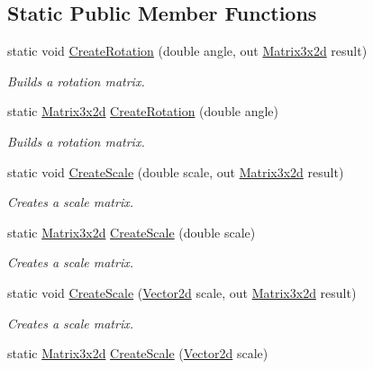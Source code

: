 \subsection*{Static Public Member Functions}
\begin{DoxyCompactItemize}
\item 
static void \hyperlink{struct_open_t_k_1_1_matrix3x2d_ad2a3abd5ddb3bcf591f5f39ba3d7c4f9}{Create\-Rotation} (double angle, out \hyperlink{struct_open_t_k_1_1_matrix3x2d}{Matrix3x2d} result)
\begin{DoxyCompactList}\small\item\em Builds a rotation matrix. \end{DoxyCompactList}\item 
static \hyperlink{struct_open_t_k_1_1_matrix3x2d}{Matrix3x2d} \hyperlink{struct_open_t_k_1_1_matrix3x2d_a1109feceae030386a0f25ecc1dbf5a28}{Create\-Rotation} (double angle)
\begin{DoxyCompactList}\small\item\em Builds a rotation matrix. \end{DoxyCompactList}\item 
static void \hyperlink{struct_open_t_k_1_1_matrix3x2d_ace558efd44d8eb53dae03909c1f8f26b}{Create\-Scale} (double scale, out \hyperlink{struct_open_t_k_1_1_matrix3x2d}{Matrix3x2d} result)
\begin{DoxyCompactList}\small\item\em Creates a scale matrix. \end{DoxyCompactList}\item 
static \hyperlink{struct_open_t_k_1_1_matrix3x2d}{Matrix3x2d} \hyperlink{struct_open_t_k_1_1_matrix3x2d_a2ba96869cfd644e502f3a5259a646184}{Create\-Scale} (double scale)
\begin{DoxyCompactList}\small\item\em Creates a scale matrix. \end{DoxyCompactList}\item 
static void \hyperlink{struct_open_t_k_1_1_matrix3x2d_a5088167a099ddd86e32a02cda3c39d3c}{Create\-Scale} (\hyperlink{struct_open_t_k_1_1_vector2d}{Vector2d} scale, out \hyperlink{struct_open_t_k_1_1_matrix3x2d}{Matrix3x2d} result)
\begin{DoxyCompactList}\small\item\em Creates a scale matrix. \end{DoxyCompactList}\item 
static \hyperlink{struct_open_t_k_1_1_matrix3x2d}{Matrix3x2d} \hyperlink{struct_open_t_k_1_1_matrix3x2d_ae939af399df6b6a7d9c17a2267092430}{Create\-Scale} (\hyperlink{struct_open_t_k_1_1_vector2d}{Vector2d} scale)

\end{DoxyCompactItemize}
